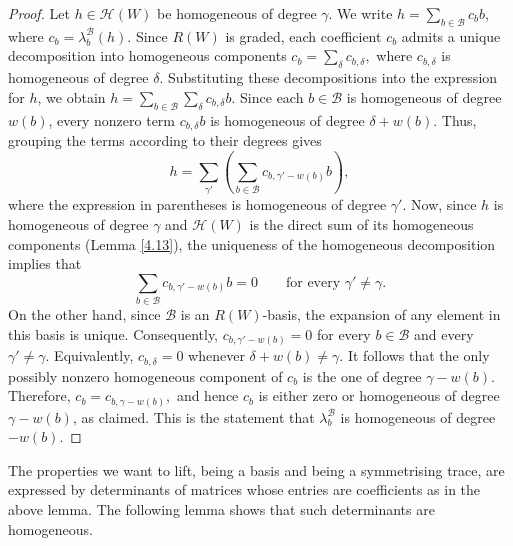 \documentclass[11pt, reqno]{amsart}
\newcommand{\cB}{\mathcal{B}}
\numberwithin{equation}{section}
\theoremstyle{remark}
\begin{document}
\begin{proof} Let $h\in\mathcal H(W)$ be homogeneous of degree $\gamma$. 
	We write 
	$
	h=\sum_{b\in\cB}c_b b$, where 
	$c_b=\lambda_b^{\cB}(h).$
	Since $R(W)$ is graded, each coefficient $c_b$ admits a unique decomposition into homogeneous components
	$
	c_b=\sum_{\delta}c_{b,\delta},$
	where $c_{b,\delta}$ is homogeneous of degree $\delta$. Substituting these decompositions into the expression for $h$, we obtain
	$
	h=\sum_{b\in\cB}\sum_{\delta}c_{b,\delta}b.
	$
	Since each $b\in\cB$ is homogeneous of degree $w(b)$, every nonzero term $c_{b,\delta}b$ is homogeneous of degree $\delta+w(b)$. Thus, grouping the terms according to their degrees gives
	\[
	h=\sum_{\gamma'}\left(
	\sum_{b\in\cB}c_{b,\gamma'-w(b)}b
	\right),
	\]
	where the expression in parentheses is homogeneous of degree $\gamma'$.
	Now, since $h$ is homogeneous of degree $\gamma$ and  $\mathcal H(W)$ is the direct sum of its homogeneous components (Lemma \ref{4.13}), the uniqueness of the homogeneous decomposition implies that
	\[
	\sum_{b\in\cB}c_{b,\gamma'-w(b)}b=0
	\qquad\text{for every }\gamma'\neq \gamma.
	\]
	On the other hand, since $\mathcal B$ is an $R(W)$-basis, the expansion of any element in this basis is unique. Consequently,
	$
	c_{b,\gamma'-w(b)}=0$
	for every $b\in\cB$
	and every $\gamma'\neq \gamma.$
	Equivalently,
	$
	c_{b,\delta}=0$
	whenever $\delta+w(b)\neq \gamma.$
	It follows that the only possibly nonzero homogeneous component of $c_b$ is the one of degree $\gamma-w(b)$. Therefore,
	$
	c_b=c_{b,\gamma-w(b)},
	$
	and hence $c_b$ is either zero or homogeneous of degree $\gamma-w(b)$, as claimed. This is the statement that $\lambda^{\mathcal B}_b$ is homogeneous of degree $-w(b)$.
\end{proof}

The properties we want to lift, being a basis and being a symmetrising
trace, are expressed by determinants of matrices whose entries are
coefficients as in the above lemma. The following lemma shows
that such determinants are homogeneous.
\end{document}
